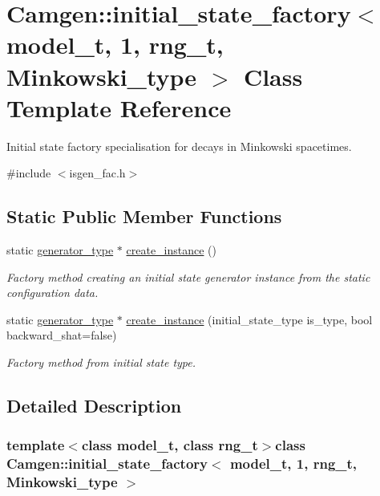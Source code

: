 \hypertarget{a00310}{}\section{Camgen\+:\+:initial\+\_\+state\+\_\+factory$<$ model\+\_\+t, 1, rng\+\_\+t, Minkowski\+\_\+type $>$ Class Template Reference}
\label{a00310}


Initial state factory specialisation for decays in Minkowski spacetimes.  




{\ttfamily \#include $<$isgen\+\_\+fac.\+h$>$}

\subsection*{Static Public Member Functions}
\begin{DoxyCompactItemize}
\item 
static \hyperlink{a00308}{generator\+\_\+type} $\ast$ \hyperlink{a00310_ab95ba128dd8e64ff816818b8bb53f367}{create\+\_\+instance} ()
\begin{DoxyCompactList}\small\item\em Factory method creating an initial state generator instance from the static configuration data. \end{DoxyCompactList}\item 
static \hyperlink{a00308}{generator\+\_\+type} $\ast$ \hyperlink{a00310_a07d9d1065d06cc56b99c0b73f6923d97}{create\+\_\+instance} (initial\+\_\+state\+\_\+type is\+\_\+type, bool backward\+\_\+shat=false)
\begin{DoxyCompactList}\small\item\em Factory method from initial state type. \end{DoxyCompactList}\end{DoxyCompactItemize}


\subsection{Detailed Description}
\subsubsection*{template$<$class model\+\_\+t, class rng\+\_\+t$>$class Camgen\+::initial\+\_\+state\+\_\+factory$<$ model\+\_\+t, 1, rng\+\_\+t, Minkowski\+\_\+type $>$}

